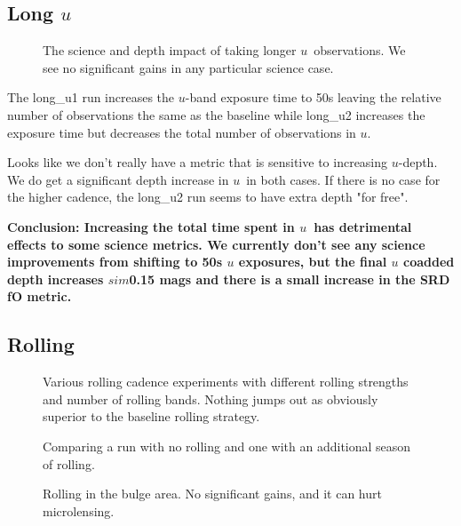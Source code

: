 \subsection{Long $u$}

\begin{figure}
\caption{The science and depth impact of taking longer $u$\ observations. We see no significant gains in any particular science case.\label{fig:long_u}}
\end{figure}


The long\_u1 run increases the $u$-band exposure time to 50s leaving the relative number of observations the same as the baseline while long\_u2 increases the exposure time but decreases the total number of observations in $u$. 

Looks like we don't really have a metric that is sensitive to increasing $u$-depth. We do get a significant depth increase in $u$\ in both cases. If there is no case for the higher cadence, the long\_u2 run seems to have extra depth "for free".

{\bf Conclusion:  Increasing the total time spent in $u$\ has detrimental effects to some science metrics. We currently don't see any science improvements from shifting to 50s $u$ exposures, but the final $u$ coadded depth increases $sim$0.15 mags and there is a small increase in the SRD fO metric.}


\subsection{Rolling}


\begin{figure}
\caption{Various rolling cadence experiments with different rolling strengths and number of rolling bands. Nothing jumps out as obviously superior to the baseline rolling strategy. \label{fig:rolling}}
\end{figure}


\begin{figure}
\caption{Comparing a run with no rolling and one with an additional season of rolling. \label{fig:rolling_more}}
\end{figure}


\begin{figure}
\caption{Rolling in the bulge area. No significant gains, and it can hurt microlensing. \label{fig:rolling_more}}
\end{figure}

